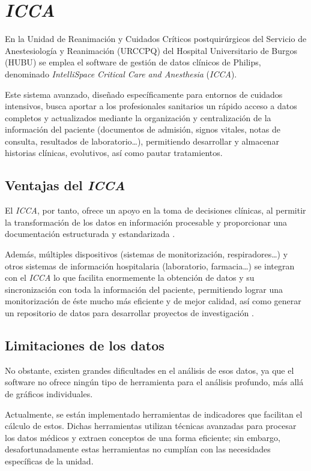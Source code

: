 \section{\textit{ICCA}}
En la Unidad de Reanimación y Cuidados Críticos postquirúrgicos del Servicio de 
Anestesiología y Reanimación (\textit{}{URCCPQ}) del Hospital Universitario de Burgos (\textit{}{HUBU}) se 
emplea el software de gestión de datos clínicos de Philips, denominado \textit{IntelliSpace 
Critical Care and Anesthesia} (\textit{ICCA}). 

Este sistema avanzado, diseñado específicamente 
para entornos de cuidados intensivos, busca aportar a los profesionales sanitarios un 
rápido acceso a datos completos y actualizados mediante la organización y 
centralización de la información del paciente (documentos de admisión, signos vitales, 
notas de consulta, resultados de laboratorio…), permitiendo desarrollar y almacenar 
historias clínicas, evolutivos, así como pautar tratamientos.

\subsection{Ventajas del \textit{ICCA}}
El \textit{ICCA}, por tanto, ofrece un apoyo en la toma de decisiones clínicas, al permitir 
la transformación de los datos en información procesable y proporcionar una 
documentación estructurada y estandarizada \cite{philipsPhilipsIntelliSpace}.

Además, múltiples dispositivos (sistemas de monitorización, respiradores…) y 
otros sistemas de información hospitalaria (laboratorio, farmacia…) se integran con el 
\textit{ICCA} lo que facilita enormemente la obtención de datos y su sincronización con toda la 
información del paciente, permitiendo lograr una monitorización de éste mucho más 
eficiente y de mejor calidad, así como generar un repositorio de datos para desarrollar 
proyectos de investigación \cite{philipsIntelliSpaceCritical}. 

\subsection{Limitaciones de los datos}
No obstante, existen grandes dificultades en el análisis de esos datos, ya que 
el software no ofrece ningún tipo de herramienta para el análisis profundo, más allá 
de gráficos individuales. 

Actualmente, se están implementado herramientas de indicadores que facilitan 
el cálculo de estos. Dichas herramientas utilizan técnicas avanzadas para procesar los 
datos médicos y extraen conceptos de una forma eficiente; sin embargo, 
desafortunadamente estas herramientas no cumplían con las necesidades específicas 
de la unidad.

